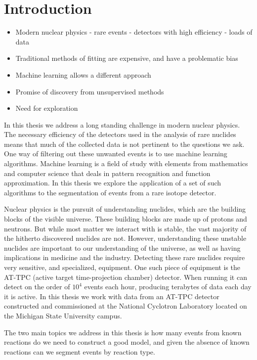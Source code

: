 \chapter{Introduction}\label{ch:introduction}

\begin{itemize}
\item Modern nuclear physics - rare events - detectors with high efficiency - loads of data 
\item Traditional methods of fitting are expensive, and have a problematic bias 
\item Machine learning allows a different approach
\item Promise of discovery from unsupervised methods 
\item Need for exploration 
\end{itemize}

In this thesis we address a long standing challenge in modern nuclear physics. 
The necessary efficiency of the detectors used in the analysis of rare nuclides means that much of the collected data is not pertinent to the questions we ask. One way of filtering out these unwanted events is to use machine learning algorithms. Machine learning is a field of study with elements from mathematics and computer science that deals in pattern recognition and function approximation. In this thesis we explore the application of a set of such algorithms to the segmentation of events from a rare isotope detector.

Nuclear physics is the pursuit of understanding nuclides, which are the building blocks of the visible universe. These building blocks are made up of protons and neutrons. But while most matter we interact with is stable, the vast majority of the hitherto discovered nuclides are not. However, understanding these unstable nuclides are important to our understanding of the universe, as well as having implications in medicine and the industry. Detecting these rare nuclides require very sensitive, and specialized, equipment. One such piece of equipment is the AT-TPC (active target time-projection chamber) detector. When running it can detect on the order of $10^4$ events each hour, producing terabytes of data each day it is active. In this thesis we work with data from an AT-TPC detector constructed and commissioned at the National Cyclotron Laboratory located on the Michigan State University campus. 

The two main topics we address in this thesis is how many events from known reactions do we need to construct a good model, and given the absence of known reactions can we segment events by reaction type. 

